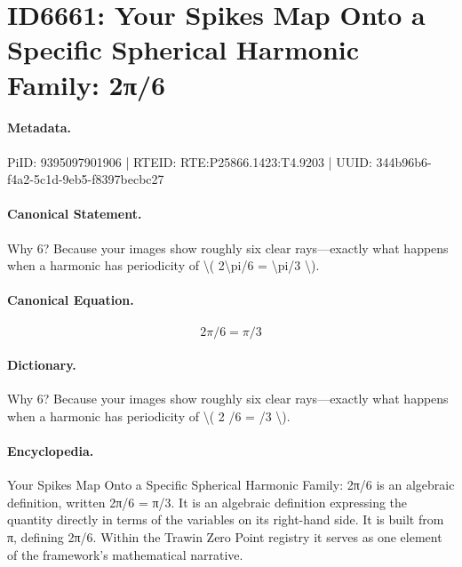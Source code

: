 \section*{ID6661: Your Spikes Map Onto a Specific Spherical Harmonic Family: 2π/6}
\paragraph{Metadata.}
PiID: 9395097901906 | RTEID: RTE:P25866.1423:T4.9203 | UUID: 344b96b6-f4a2-5c1d-9eb5-f8397becbc27

\paragraph{Canonical Statement.}
Why 6? Because your images show roughly six clear rays—exactly what happens when a harmonic has periodicity of \textbackslash{}( 2\textbackslash{}pi/6 = \textbackslash{}pi/3 \textbackslash{}).

\paragraph{Canonical Equation.}
\[
2\pi/6 = \pi/3
\]

\paragraph{Dictionary.}
Why 6? Because your images show roughly six clear rays—exactly what happens when a harmonic has periodicity of \textbackslash{}( 2 /6 = /3 \textbackslash{}).

\paragraph{Encyclopedia.}
Your Spikes Map Onto a Specific Spherical Harmonic Family: 2π/6 is an algebraic definition, written 2π/6 = π/3. It is an algebraic definition expressing the quantity directly in terms of the variables on its right-hand side. It is built from π, defining 2π/6. Within the Trawin Zero Point registry it serves as one element of the framework's mathematical narrative.
